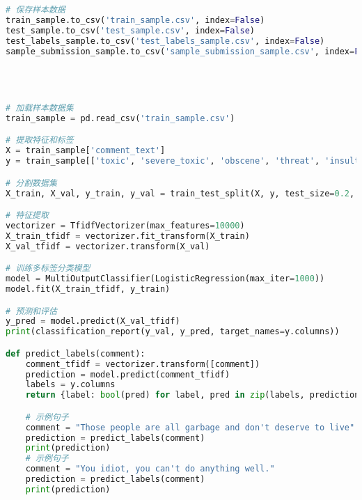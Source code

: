 \documentclass{article}
\begin{document}
\begin{lstlisting}[language=Python]
# 保存样本数据
train_sample.to_csv('train_sample.csv', index=False)
test_sample.to_csv('test_sample.csv', index=False)
test_labels_sample.to_csv('test_labels_sample.csv', index=False)
sample_submission_sample.to_csv('sample_submission_sample.csv', index=False)




# 加载样本数据集
train_sample = pd.read_csv('train_sample.csv')

# 提取特征和标签
X = train_sample['comment_text']
y = train_sample[['toxic', 'severe_toxic', 'obscene', 'threat', 'insult', 'identity_hate']]

# 分割数据集
X_train, X_val, y_train, y_val = train_test_split(X, y, test_size=0.2, random_state=42)

# 特征提取
vectorizer = TfidfVectorizer(max_features=10000)
X_train_tfidf = vectorizer.fit_transform(X_train)
X_val_tfidf = vectorizer.transform(X_val)

# 训练多标签分类模型
model = MultiOutputClassifier(LogisticRegression(max_iter=1000))
model.fit(X_train_tfidf, y_train)

# 预测和评估
y_pred = model.predict(X_val_tfidf)
print(classification_report(y_val, y_pred, target_names=y.columns))

def predict_labels(comment):
    comment_tfidf = vectorizer.transform([comment])
    prediction = model.predict(comment_tfidf)
    labels = y.columns
    return {label: bool(pred) for label, pred in zip(labels, prediction[0])}

    # 示例句子
    comment = "Those people are all garbage and don't deserve to live"
    prediction = predict_labels(comment)
    print(prediction)
    # 示例句子
    comment = "You idiot, you can't do anything well."
    prediction = predict_labels(comment)
    print(prediction)
    

\end{lstlisting}
\end{document}
